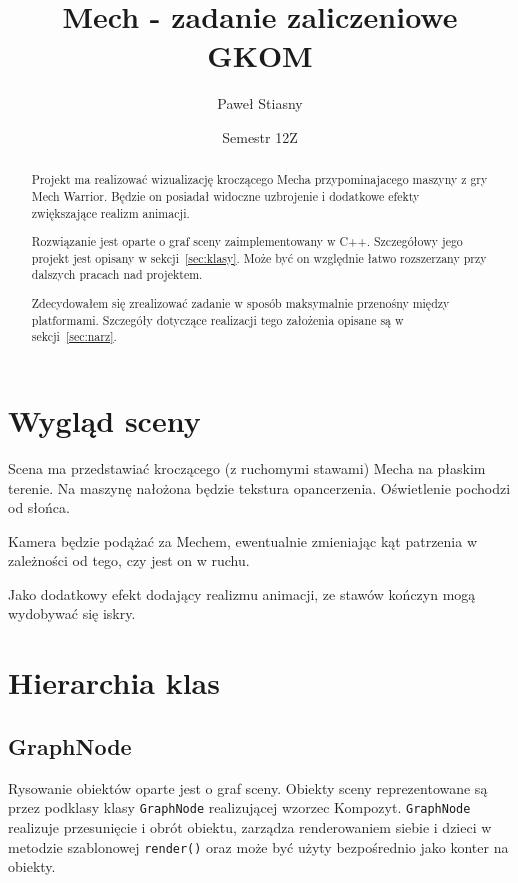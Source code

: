 \documentclass[12pt,a4paper]{article}
\title{Mech - zadanie zaliczeniowe GKOM}
\author{Paweł Stiasny}
\date{Semestr 12Z}
\begin{document}
\begin{titlepage}
\maketitle

\begin{abstract}
Projekt ma realizować wizualizację kroczącego Mecha przypominajacego maszyny z
gry Mech Warrior.  Będzie on posiadał widoczne uzbrojenie i dodatkowe efekty
zwiększające realizm animacji.

Rozwiązanie jest oparte o graf sceny zaimplementowany w C++.  Szczegółowy jego
projekt jest opisany w sekcji~\ref{sec:klasy}.  Może być on względnie łatwo
rozszerzany przy dalszych pracach nad projektem.

Zdecydowałem się zrealizować zadanie w sposób maksymalnie przenośny między
platformami.  Szczegóły dotyczące realizacji tego założenia opisane są w
sekcji~\ref{sec:narz}.
\end{abstract}
\end{titlepage}

\section{Wygląd sceny}
Scena ma przedstawiać kroczącego (z ruchomymi stawami) Mecha na płaskim
terenie.  Na maszynę nałożona będzie tekstura opancerzenia.  Oświetlenie
pochodzi od słońca.

Kamera będzie podążać za Mechem, ewentualnie zmieniając kąt patrzenia w
zależności od tego, czy jest on w ruchu.

Jako dodatkowy efekt dodający realizmu animacji, ze stawów kończyn mogą
wydobywać się iskry.

\section{Hierarchia klas}
\label{sec:klasy}
\subsection{GraphNode}
Rysowanie obiektów oparte jest o graf sceny.  Obiekty sceny reprezentowane są
przez podklasy klasy \texttt{GraphNode} realizującej wzorzec Kompozyt.
\texttt{GraphNode} realizuje przesunięcie i obrót obiektu, zarządza
renderowaniem siebie i dzieci w metodzie szablonowej \texttt{render()} oraz
może być użyty bezpośrednio jako konter na obiekty.
\end{document}
